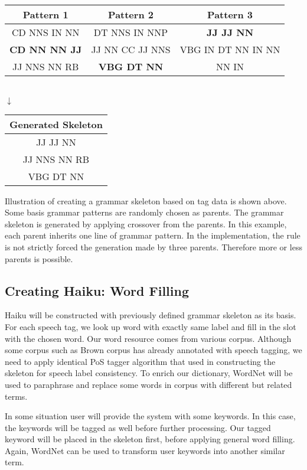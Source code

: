 \begin{table}[h]
	\centering
	\begin{tabular}{|c|c|c|}
		\hline Pattern 1 & Pattern 2 & Pattern 3 \\
		\hline CD NNS IN NN & DT NNS IN NNP &\textbf{ JJ JJ NN} \\ 
		 \textbf{CD NN NN JJ} & JJ NN CC JJ NNS & VBG IN DT NN IN NN \\ 
		 JJ NNS NN RB & \textbf{VBG DT NN} & NN IN\\ 
		\hline
	\end{tabular} 
	\\
	$\downarrow$
	\\
	\begin{tabular}{|c|}
			\hline Generated Skeleton \\
			\hline  
			 JJ JJ NN  \\ 
			  JJ NNS NN RB \\ 
			  VBG DT NN \\
			\hline
		\end{tabular} 
\end{table}

Illustration of creating a grammar skeleton based on tag data is shown above. Some basis grammar patterns are randomly chosen as parents. The grammar skeleton is generated by applying crossover from the parents. In this example, each parent inherits one line of grammar pattern. In the implementation, the rule is not strictly forced the generation made by three parents. Therefore more or less parents is possible.

\subsection{Creating Haiku: Word Filling}

Haiku will be constructed with previously defined grammar skeleton as its basis. For each speech tag, we look up word with exactly same label and fill in the slot with the chosen word. Our word resource comes from various corpus. Although some corpus such as Brown corpus has already annotated with speech tagging, we need to apply identical PoS tagger algorithm that used in constructing the skeleton for speech label consistency. To enrich our dictionary, WordNet will be used to paraphrase and replace some words in corpus with different but related terms. 

In some situation user will provide the system with some keywords. In this case, the keywords will be tagged as well before further processing. Our tagged keyword will be placed in the skeleton first, before applying general word filling. Again, WordNet can be used to transform user keywords into another similar term.

